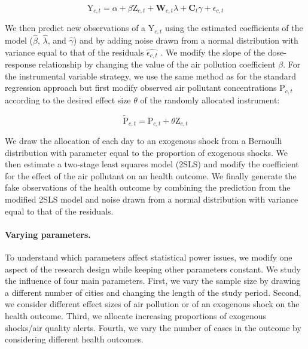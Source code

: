 \documentclass[12pt]{article}
\begin{document}
        \begin{equation}
        \text{Y}_{c,t} = \alpha + \beta\text{Z}_{c,t} + \textbf{W}_{c,t}\lambda + \textbf{C}_{t}\gamma + \epsilon_{c,t}
        \end{equation}
        
        \noindent We then predict new observations of a $\text{Y}_{c,t}$ using the estimated coefficients of the model ($\hat{\beta}$, $\hat{\lambda}$, and $\hat{\gamma}$) and by adding noise drawn from a normal distribution with variance equal to that of the residuals $\widehat{\epsilon_{c,t}}$ \citep{peng2006model}. We modify the slope of the dose-response relationship by changing the value of the air pollution coefficient $\beta$. For the instrumental variable strategy, we use the same method as for the standard regression approach but first modify observed air pollutant concentrations $\text{P}_{c,t}$ according to the desired effect size $\theta$ of the randomly allocated instrument: 
        
        \begin{equation}
        \widetilde{\text{P}}_{c,t} = \text{P}_{c,t} + \theta\text{Z}_{c,t}
        \end{equation}
        
        \noindent We draw the allocation of each day to an exogenous shock from a Bernoulli distribution with parameter equal to the proportion of exogenous shocks. We then estimate a two-stage least squares model (2SLS) and modify the coefficient for the effect of the air pollutant on an health outcome. We finally generate the fake observations of the health outcome by combining the prediction from the modified 2SLS model and noise drawn from a normal distribution with variance equal to that of the residuals.
        
        \paragraph{Varying parameters.} To understand which parameters affect statistical power issues, we modify one aspect of the research design while keeping other parameters constant. We study the influence of four main parameters. First, we vary the sample size by drawing a different number of cities and changing the length of the study period. Second, we consider different effect sizes of air pollution or of an exogenous shock on the health outcome. Third, we allocate increasing proportions of exogenous shocks/air quality alerts. Fourth, we vary the number of cases in the outcome by considering different health outcomes.
\end{document}
